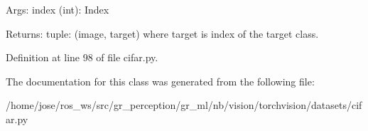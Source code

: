 \begin{DoxyVerb}Args:
    index (int): Index

Returns:
    tuple: (image, target) where target is index of the target class.
\end{DoxyVerb}
 

Definition at line 98 of file cifar.\+py.



The documentation for this class was generated from the following file\+:\begin{DoxyCompactItemize}
\item 
/home/jose/ros\+\_\+ws/src/gr\+\_\+perception/gr\+\_\+ml/nb/vision/torchvision/datasets/cifar.\+py\end{DoxyCompactItemize}
